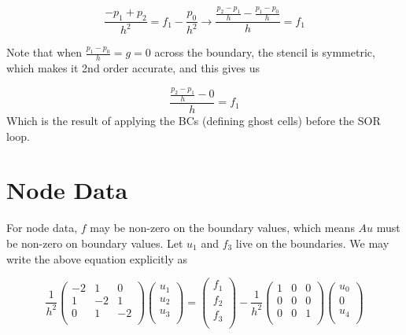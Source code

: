 \documentclass[11pt]{article}
\begin{document}
\begin{equation}
\frac{-p_1+p_2}{h^2} = f_1 - \frac{p_0}{h^2}
\rightarrow
\frac{\frac{p_2-p_1}{h} - \frac{p_1-p_0}{h}}{h} = f_1
\end{equation}

Note that when $\frac{p_1-p_0}{h} = g = 0$ across the boundary, the stencil is symmetric, which makes it 2nd order accurate, and this gives us

\begin{equation}
\frac{\frac{p_2-p_1}{h} - 0}{h} = f_1
\end{equation}
Which is the result of applying the BCs (defining ghost cells) before the SOR loop.

\section{Node Data}
For node data, $f$ may be non-zero on the boundary values, which means $Au$ must be non-zero on boundary values. Let $u_1$ and $f_3$ live on the boundaries. We may write the above equation explicitly as 

\begin{equation}
\frac{1}{h^2}
 \begin{pmatrix}
  -2 &  1 &  0 \\
   1 & -2 &  1 \\
   0 &  1 & -2 \\
 \end{pmatrix}
 \begin{pmatrix}
  u_1 \\  u_2 \\  u_3 \\
 \end{pmatrix}
  = 
 \begin{pmatrix}
  f_1 \\  f_2 \\  f_3 \\
 \end{pmatrix}
   -
\frac{1}{h^2}
 \begin{pmatrix}
   1 &  0 &  0 \\
   0 &  0 &  0 \\
   0 &  0 &  1 \\
 \end{pmatrix}
 \begin{pmatrix}
  u_0 \\
  0 \\
  u_4 \\
 \end{pmatrix}
\end{equation}
\end{document}
